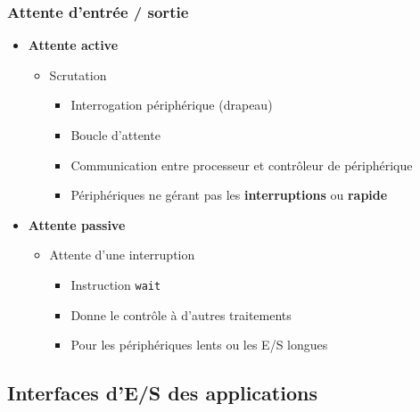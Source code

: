 \begin{frame}
\frametitle{Attente d’entrée / sortie}
\begin{itemize}
\item \textbf{Attente active}
\begin{itemize}
\item Scrutation
\begin{itemize}
\item Interrogation périphérique (drapeau)
\item Boucle d’attente
\item Communication entre processeur et contrôleur de périphérique
\item Périphériques ne gérant pas les \textbf{interruptions} ou \textbf{rapide}
\end{itemize}
\end{itemize}
\item \textbf{Attente passive}
\begin{itemize}
\item Attente d'une interruption
\begin{itemize}
\item Instruction \texttt{wait}
\item Donne le contrôle à d’autres traitements
\item Pour les périphériques lents ou les E/S longues
\end{itemize}
\end{itemize}
\end{itemize}
\end{frame}


\subsection{Interfaces d'E/S des applications}

